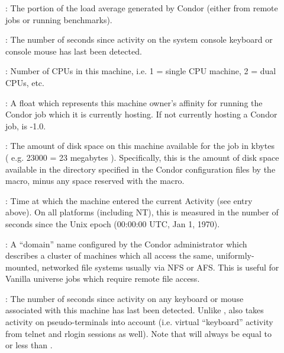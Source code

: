 \begin{description}
\item[] : The portion of the load average generated by Condor (either
from remote jobs or running benchmarks).
%
\item[] : The number of seconds since activity on the system
console keyboard or console mouse has last been detected.
%
\item[] : Number of CPUs in this machine, i.e. 1 = single CPU machine, 2 = dual
CPUs, etc.
%
\item[] : A float which represents this machine owner's affinity
for running the Condor job which it is currently hosting.  If not
currently hosting a Condor job,  is -1.0.
%
\item[] : The amount of disk space on this machine available for
the job in kbytes ( e.g. 23000 = 23 megabytes ).  Specifically, this
is the amount of disk space available in the directory specified in
the Condor configuration files by the  macro, minus any
space reserved with the  macro.
%
\item[] : Time at which the machine
entered the current Activity (see  entry above).  On
all platforms (including NT), this is measured in the number of
seconds since the Unix epoch (00:00:00 UTC, Jan 1, 1970).
%
\item[] : A ``domain'' name configured by the
Condor administrator which describes a cluster of machines which all
access the same, uniformly-mounted, networked file systems usually via
NFS or AFS.  This is useful for Vanilla universe jobs which require
remote file access.
%
\item[] : The number of seconds since activity on any
keyboard or mouse associated with this machine has last been detected.
Unlike ,  also takes activity 
on pseudo-terminals into
account (i.e. virtual ``keyboard'' activity from telnet and rlogin
sessions as well).  Note that  will always be equal to or
less than .
%

\end{description}
